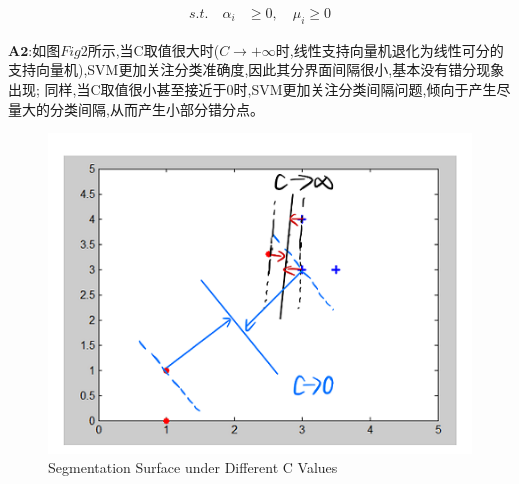 \documentclass[homework]{IEEEtran}
\begin{document}
\begin{CJK}{UTF8}{gkai}
\begin{align*}
s.t. \quad \alpha_i &\geq 0,\quad \mu_i \geq 0
\end{align*}\par
$\mathbf{A2}$:如图$Fig2$所示,当C取值很大时($C\to +\infty$时,线性支持向量机退化为线性可分的支持向量机),SVM更加关注分类准确度,因此其分界面间隔很小,基本没有错分现象出现;
同样,当C取值很小甚至接近于0时,SVM更加关注分类间隔问题,倾向于产生尽量大的分类间隔,从而产生小部分错分点。
\begin{figure}[htb]
    \centerline{\includegraphics{Images/fig2.png}}
    \caption{Segmentation Surface under Different C Values}
    \label{fig2}
    \end{figure}


\end{CJK}
\end{document}
